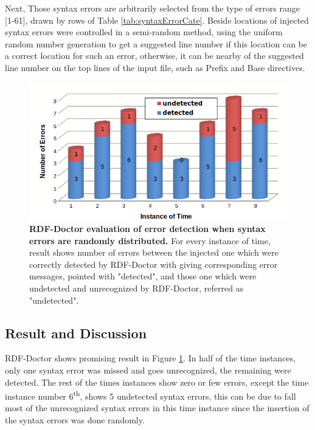  Next, Those syntax errors are arbitrarily selected from the type of errors range [1-61], drawn by rows of Table \ref{tab:syntaxErrorCate}. Beside locations of injected syntax errors were controlled in a semi-random method, using the uniform random number generation to get a suggested line number if this location can be a correct location for such an error, otherwise, it can be nearby of the suggested line number on the top lines of the input file, such as Prefix and Base directives.   

	\begin{figure}[ht]
	\begin{center}
		\includegraphics[scale=0.6,angle=0]{images/Experiment02-02.png}
		\setlength\belowcaptionskip{-5mm}
		\caption{\textbf{RDF-Doctor evaluation of error detection when syntax errors are randomly distributed.} For every instance of time, result shows number of errors between the injected one which were correctly detected by RDF-Doctor with giving corresponding error messages, pointed with "detected", and those one which were undetected and unrecognized by RDF-Doctor, referred as "undetected".} 
		\label{Fig:Experiment02-02}
	\end{center}
\end{figure}
\subsection{Result and Discussion}
RDF-Doctor shows promising result in Figure \ref{Fig:Experiment02-02}. In half of the time instances, only one syntax error was missed and goes unrecognized, the remaining were detected. The rest of the times instances show zero or few errors, except the time instance number 6\textsuperscript{th}, shows 5 undetected syntax errors, this can be due to fall most of the unrecognized syntax errors in this time instance since the insertion of the syntax errors was done randomly.  

